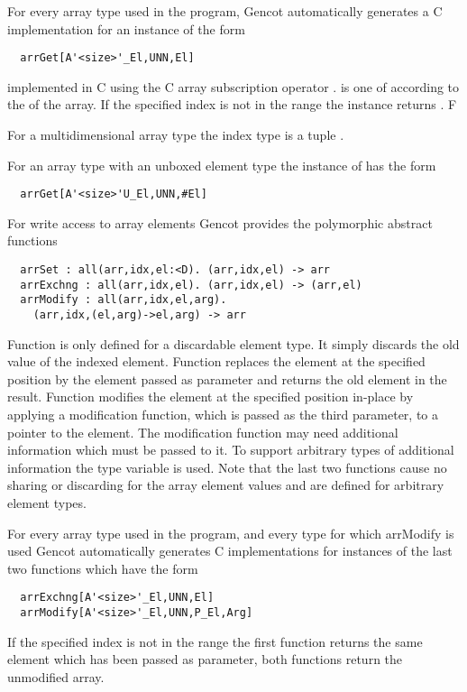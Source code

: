 For every array type  used in the program, Gencot automatically 
generates a C implementation for an instance of the form
\begin{verbatim}
  arrGet[A'<size>'_El,UNN,El]
\end{verbatim}
implemented in C using the C array subscription operator \code{[]}. 
 is one of  according to the  of the array. If the specified index 
is not in the range  the instance returns . F

For a multidimensional array type  the index type is a tuple .

For an array type  with an unboxed element type the 
instance of  has the form
\begin{verbatim}
  arrGet[A'<size>'U_El,UNN,#El]
\end{verbatim}

For write access to array elements Gencot provides the polymorphic abstract functions
\begin{verbatim}
  arrSet : all(arr,idx,el:<D). (arr,idx,el) -> arr
  arrExchng : all(arr,idx,el). (arr,idx,el) -> (arr,el)
  arrModify : all(arr,idx,el,arg). 
    (arr,idx,(el,arg)->el,arg) -> arr
\end{verbatim}
Function  is only defined for a discardable element type. It simply discards the old value of the indexed element.
Function 
replaces the element at the specified position by the element passed as parameter and returns the old element in the result.
Function  modifies the element at the specified position in-place by applying a modification function,
which is passed as the third parameter, to a pointer to the element. The modification function may need additional information 
which must be passed to it. 
To support arbitrary types of additional information the type variable  is used.
Note that the last two functions cause no sharing or discarding for the array element values and are defined for arbitrary 
element types.

For every array type  used in the program, and every type  for which
arrModify is used Gencot automatically 
generates C implementations for instances of the last two functions which have the form
\begin{verbatim}
  arrExchng[A'<size>'_El,UNN,El]
  arrModify[A'<size>'_El,UNN,P_El,Arg]
\end{verbatim}
If the specified
index is not in the range  the first function returns the same element which has been
passed as parameter, both functions return the unmodified array. 


